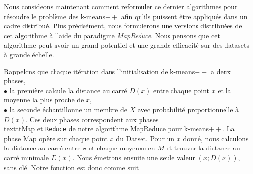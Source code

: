 \documentclass[12pt]{article}
\numberwithin{equation}{section}
\theoremstyle{plain}
\def\v1{\vskip0.2cm}
\begin{document}
Nous consideons maintenant comment reformuler ce dernier algorithmes pour résoudre le problème des k-means$++$ afin qu'ils puissent être appliqués dans un cadre distribué. Plus précisément, nous formulerons une versions distribuées de cet algorithme à l'aide du paradigme \textit{MapReduce}. Nous pensons que cet algorithme peut avoir un grand  potentiel et une grande efficacité sur des datasets à grande échelle.


Rappelons que chaque itération dans l'initialisation de k-means$++$ a deux phases,
\\
 $\bullet$ la première calcule la distance au carré $D (x)$ entre chaque point $x$ et la moyenne la plus proche de $x$, \\
$\bullet$ la seconde échantillonne un membre de $X$ avec probabilité proportionnelle à $D (x)$. Ces deux phases correspondent aux phases \\texttt{Map} et \texttt{Reduce} de notre algorithme MapReduce pour k-means$++$.\v1
La phase Map opère sur chaque point $x$ du Datset. Pour un $x$ donné, nous calculons la distance au carré entre $x$ et chaque moyenne en $M$ et trouver la distance au carré minimale $D (x)$. Nous émettons ensuite une seule valeur $(x; D(x))$,
sans clé. Notre fonction est donc comme suit 
\v1
\end{document}
